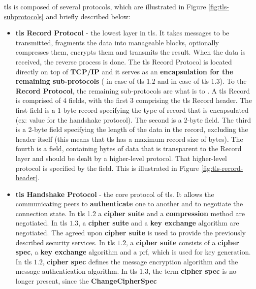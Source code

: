 \documentclass{llncs}
\begin{document}
\gls{tls} is composed of several protocols, which are illustrated in Figure
\ref{fig:tls-subprotocols} and briefly described below:
\begin{itemize}
  \item \textbf{\gls{tls} Record Protocol} - the lowest layer in \gls{tls}.
  It takes messages to be transmitted, fragments the data into manageable
  blocks, optionally compresses them, encrypts them and transmits the result.
  When the data is received, the reverse process is done. The \gls{tls}
  Record Protocol is located directly on top of \textbf{TCP/IP} and it serves as an
   \textbf{encapsulation for the remaining sub-protocols} ( in case of \gls{tls} 1.2
   and  in case of \gls{tls} 1.3). To the  \textbf{Record Protocol},
   the remaining sub-protocols are what  is to .
   A \gls{tls} Record is comprised of 4 fields, with the first 3 comprising the
   \gls{tls} Record header. The first field is a 1-byte record 
   specifying the type of record that is encapsulated (ex: value 
   for the handshake protocol). The second is a 2-byte  field. The third is a
   2-byte  field specifying the length of the data in the record, excluding
   the header itself (this means that \gls{tls} has a maximum record size
   of  bytes). The fourth is a  field,
   containing  bytes of data that is
   transparent to the Record layer and should be dealt by a higher-level protocol. That higher-level protocol is specified by the  field. This is illustrated in Figure \ref{fig:tls-record-header}.
  \item \textbf{\gls{tls} Handshake Protocol} - the core protocol of \gls{tls}.
  It allows the communicating peers to \textbf{authenticate} one to another and to negotiate the connection state. In \gls{tls} 1.2
  a \textbf{cipher suite} and a \textbf{compression} method are negotiated. In \gls{tls} $1.3$, a \textbf{cipher suite} and a \textbf{key exchange} algorithm are negotiated. The agreed upon \textbf{cipher suite} is used to provide the previously described security services. In
  \gls{tls} $1.2$, a \textbf{cipher suite} consists of a \textbf{cipher spec},
  a \textbf{key exchange} algorithm and a \gls{prf}, which is used for key generation.
  In \gls{tls} $1.2$,
  \textbf{cipher spec} defines the message encryption algorithm and the message
  authentication algorithm. In \gls{tls} 1.3, the term
   \textbf{cipher spec} is no longer present, since the \textbf{ChangeCipherSpec}

\end{itemize}
\end{document}
